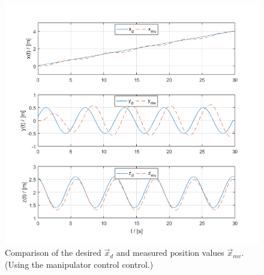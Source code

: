 \begin{figure}[h!]
	\centering
	\includegraphics[width=\columnwidth]{./pictures/manip_traj_pos.png}
	\caption{Comparison of the desired $\vec{x}_d$ and measured position values $\vec{x}_{mv}$. (Using the manipulator control control.)}
	\label{fig:manip_pos}
\end{figure}

